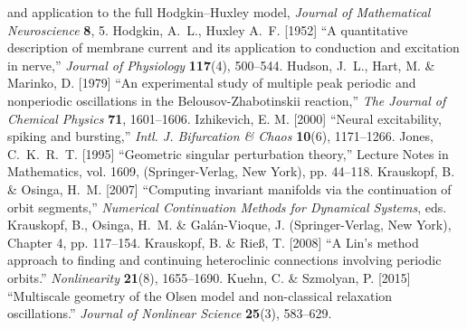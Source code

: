 \documentclass{ws-ijbc}
\begin{document}
\begin{thebibliography}{46}
{and application to the full {H}odgkin--{H}uxley model,}
\newblock \emph{Journal of Mathematical Neuroscience} \textbf{8}, 5.
% 
Hodgkin, A.~L., Huxley A.~F. [1952] 
\newblock \enquote{A quantitative description of membrane 
current and its application to conduction and excitation in nerve,}
\newblock \emph{Journal of Physiology} \textbf{117}(4), 500--544.
% 
Hudson, J.~L., Hart, M. \& Marinko, D. [1979] \enquote{An experimental study of
multiple peak periodic and nonperiodic oscillations in the
{B}elousov-{Z}habotinskii reaction,} \emph{The Journal of Chemical Physics}
\textbf{71},  1601--1606.
% 
Izhikevich, E. M. [2000]
\newblock \enquote{Neural excitability, spiking and bursting,}
\newblock \emph{Intl. J. Bifurcation \& Chaos} \textbf{10}(6), 1171--1266.
% 
% 
Jones, C.~K.~R.~T. [1995]
\newblock \enquote{Geometric singular perturbation theory,} 
\newblock Lecture Notes in Mathematics, vol. 1609,
(Springer-Verlag, New York), pp. 44--118.
%
Krauskopf, B. \& Osinga, H.~M. [2007]
\newblock \enquote{Computing invariant manifolds via the continuation of orbit segments,}
\newblock \emph{Numerical Continuation Methods for Dynamical Systems}, eds. Krauskopf, B., Osinga, H.~M. \&
  Gal{\'a}n-Vioque, J. (Springer-Verlag, New York), Chapter 4, pp. 117--154.
%
Krauskopf, B. \& Rie{\ss}, T. [2008]
\newblock \enquote{{A {L}in's method approach to finding and continuing heteroclinic connections involving periodic orbits}.}
\newblock \emph{Nonlinearity} \textbf{21}(8),  1655--1690.
%
% 
Kuehn, C. \& Szmolyan, P. [2015]
\newblock \enquote{{Multiscale geometry of the {O}lsen model and non-classical relaxation oscillations}.} \newblock \emph{Journal of Nonlinear Science} \textbf{25}(3),  583--629.
% 

\end{thebibliography}
\end{document}
